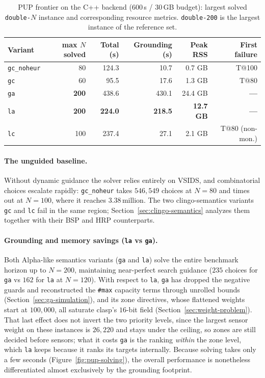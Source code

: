 \begin{table}[H]
\centering
\footnotesize
\setlength{\tabcolsep}{5pt}
\begin{tabular}{lrrrrr}
\toprule
\textbf{Variant} & \textbf{max $N$ solved} & \textbf{Total (s)} & \textbf{Grounding (s)} & \textbf{Peak RSS} & \textbf{First failure}\\
\midrule
\texttt{gc\_noheur} & 80  & 124.3  & 10.7  & 0.7 GB & T@100\\
\texttt{gc}        & 60  & 95.5   & 17.6  & 1.3 GB & T@80\\
\texttt{ga}        & \textbf{200} & 438.6  & 430.1 & 24.4 GB & \textbf{---}\\
\texttt{la}        & \textbf{200} & \textbf{224.0}  & \textbf{218.5} & \textbf{12.7 GB} & \textbf{---}\\
\texttt{lc}        & 100 & 237.4  & 27.1  & 2.1 GB & T@80 (non-mon.)\\
\bottomrule
\end{tabular}
\caption{PUP frontier on the C++ backend ($600$\,s / $30$\,GB budget): largest solved \texttt{double-$N$} instance and corresponding resource metrics. \texttt{double-200} is the largest instance of the reference set.}
\label{tab:pup-frontier}
\end{table}

\paragraph{The unguided baseline.}
Without dynamic guidance the solver relies entirely on VSIDS, and combinatorial choices escalate rapidly: \texttt{gc\_noheur} takes $546{,}549$ choices at $N=80$ and times out at $N=100$, where it reaches $3.38$\,million. The two clingo-semantics variants \texttt{gc} and \texttt{lc} fail in the same region; Section~\ref{sec:clingo-semantics} analyzes them together with their BSP and HRP counterparts.

\paragraph{Grounding and memory savings (\texttt{la} vs \texttt{ga}).}
Both Alpha-like semantics variants (\texttt{ga} and \texttt{la}) solve the entire benchmark horizon up to $N=200$, maintaining near-perfect search guidance ($235$ choices for \texttt{ga} vs $162$ for \texttt{la} at $N=120$). With respect to \texttt{la}, \texttt{ga} has dropped the negative guards and reconstructed the \texttt{\#max} capacity terms through unrolled bounds (Section~\ref{sec:ga-simulation}), and its zone directives, whose flattened weights start at $100{,}000$, all saturate clasp's $16$-bit field (Section~\ref{sec:weight-problem}). That last effect does not invert the two priority levels, since the largest sensor weight on these instances is $26{,}220$ and stays under the ceiling, so zones are still decided before sensors; what it costs \texttt{ga} is the ranking \emph{within} the zone level, which \texttt{la} keeps because it ranks its targets internally. Because solving takes only a few seconds (Figure~\ref{fig:pup-solving}), the overall performance is nonetheless differentiated almost exclusively by the grounding footprint.

